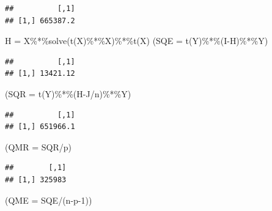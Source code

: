 \documentclass[
]{book}
\newenvironment{Shaded}{\begin{snugshade}}{\end{snugshade}}
\newcommand{\AttributeTok}[1]{\textcolor[rgb]{0.77,0.63,0.00}{#1}}
\newcommand{\DecValTok}[1]{\textcolor[rgb]{0.00,0.00,0.81}{#1}}
\newcommand{\FunctionTok}[1]{\textcolor[rgb]{0.00,0.00,0.00}{#1}}
\newcommand{\NormalTok}[1]{#1}
\newcommand{\OtherTok}[1]{\textcolor[rgb]{0.56,0.35,0.01}{#1}}
\newcommand{\SpecialCharTok}[1]{\textcolor[rgb]{0.00,0.00,0.00}{#1}}
\begin{document}
\begin{verbatim}
##          [,1]
## [1,] 665387.2
\end{verbatim}

\begin{Shaded}
\begin{Highlighting}[]
\NormalTok{H }\OtherTok{=}\NormalTok{ X}\SpecialCharTok{\%*\%}\FunctionTok{solve}\NormalTok{(}\FunctionTok{t}\NormalTok{(X)}\SpecialCharTok{\%*\%}\NormalTok{X)}\SpecialCharTok{\%*\%}\FunctionTok{t}\NormalTok{(X)}
\NormalTok{(}\AttributeTok{SQE =} \FunctionTok{t}\NormalTok{(Y)}\SpecialCharTok{\%*\%}\NormalTok{(I}\SpecialCharTok{{-}}\NormalTok{H)}\SpecialCharTok{\%*\%}\NormalTok{Y)}
\end{Highlighting}
\end{Shaded}

\begin{verbatim}
##          [,1]
## [1,] 13421.12
\end{verbatim}

\begin{Shaded}
\begin{Highlighting}[]
\NormalTok{(}\AttributeTok{SQR =} \FunctionTok{t}\NormalTok{(Y)}\SpecialCharTok{\%*\%}\NormalTok{(H}\SpecialCharTok{{-}}\NormalTok{J}\SpecialCharTok{/}\NormalTok{n)}\SpecialCharTok{\%*\%}\NormalTok{Y)}
\end{Highlighting}
\end{Shaded}

\begin{verbatim}
##          [,1]
## [1,] 651966.1
\end{verbatim}

\begin{Shaded}
\begin{Highlighting}[]
\NormalTok{(}\AttributeTok{QMR =}\NormalTok{ SQR}\SpecialCharTok{/}\NormalTok{p)}
\end{Highlighting}
\end{Shaded}

\begin{verbatim}
##        [,1]
## [1,] 325983
\end{verbatim}

\begin{Shaded}
\begin{Highlighting}[]
\NormalTok{(}\AttributeTok{QME =}\NormalTok{ SQE}\SpecialCharTok{/}\NormalTok{(n}\SpecialCharTok{{-}}\NormalTok{p}\DecValTok{{-}1}\NormalTok{))}
\end{Highlighting}
\end{Shaded}
\end{document}
